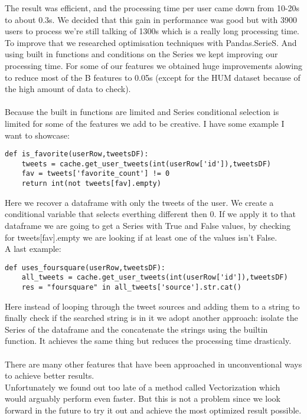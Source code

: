 \documentclass[a4paper,11pt]{article}
\begin{document}
The result was efficient, and the processing time per user came down from 10-20s to about 0.3s. We decided that this gain in performance was good but with 3900 users to process we're still talking of 1300s which is a really long processing time. To improve that we researched optimisation techniques with Pandas.SerieS. And using built in functions and conditions on the Series we kept improving our processing time. For some of our features we obtained huge improvements alowing to reduce most of the B features to 0.05s (except for the HUM dataset because of the high amount of data to check).\\\\

Because the built in functions are limited and Series conditional selection is limited for some of the features we add to be creative. I have some example I want to showcase:

\begin{verbatim}
def is_favorite(userRow,tweetsDF):
	tweets = cache.get_user_tweets(int(userRow['id']),tweetsDF)
	fav = tweets['favorite_count'] != 0
	return int(not tweets[fav].empty)
\end{verbatim}
Here we recover a dataframe with only the tweets of the user. We create a conditional variable that selects everthing different then 0. If we apply it to that dataframe we are going to get a Series with True and False values, by checking for tweets[fav].empty we are looking if at least one of the values isn't False.
\\ A last example: 
\begin{verbatim}
def uses_foursquare(userRow,tweetsDF):
	all_tweets = cache.get_user_tweets(int(userRow['id']),tweetsDF)
	res = "foursquare" in all_tweets['source'].str.cat()
\end{verbatim}
Here instead of looping through the tweet sources and adding them to a string to finally check if the searched string is in it we adopt another approach: isolate the Series of the dataframe and the concatenate the strings using the builtin function. It achieves the same thing but reduces the processing time drasticaly.\\\\

There are many other features that have been approached in unconventional ways to achieve better results. \\

Unfortunately we found out too late of a method called Vectorization which would arguably perform even faster. But this is not a problem since we look forward in the future to try it out and achieve the most optimized result possible.
\end{document}
